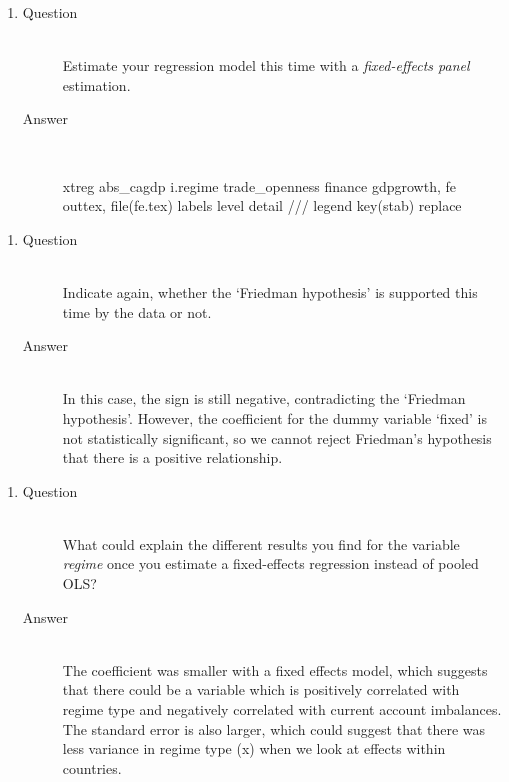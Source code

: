 \documentclass{article}
\begin{document}
  \begin{enumerate}[label=(\alph*)]
    \item 
    \begin{description}
      \item[Question] \hfill \\
      Estimate your regression model this time with a \textit{fixed-effects panel} estimation.
      \item[Answer] \hfill \\
      \begin{CVerbatim}
xtreg abs_cagdp i.regime trade_openness finance gdpgrowth, fe
outtex, file(fe.tex) labels level detail ///
	legend key(stab) replace
      \end{CVerbatim}
      
    \end{description}
  \end{enumerate}
  
  \begin{enumerate}[label=(\alph*)]
    \item 
    \begin{description}
      \item[Question] \hfill \\
      Indicate again, whether the `Friedman hypothesis' is supported this time by the data or not.
      \item[Answer] \hfill \\
      In this case, the sign is still negative, contradicting the `Friedman hypothesis'. However, the coefficient for the dummy variable `fixed' is not statistically significant, so we cannot reject Friedman's hypothesis that there is a positive relationship. 
    \end{description}
  \end{enumerate}
  
  \begin{enumerate}[label=(\alph*)]
    \item 
    \begin{description}
      \item[Question] \hfill \\
      What could explain the different results you find for the variable \textit{regime} once you estimate a fixed-effects regression instead of pooled OLS?
      \item[Answer] \hfill \\
      The coefficient was smaller with a fixed effects model, which suggests that there could be a variable which is positively correlated with regime type and negatively correlated with current account imbalances. The standard error is also larger, which could suggest that there was less variance in regime type (x) when we look at effects within countries. 
    \end{description}
  \end{enumerate}
\end{document}
